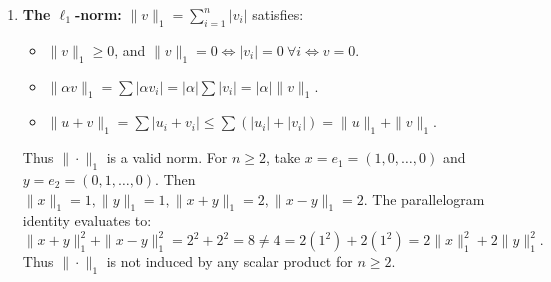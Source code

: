 \begin{exercisesolution}
\begin{enumerate}[label=\textbf{(\alph*)}]
    \item \textbf{The $\ell_1$-norm:}
    $\|v\|_1 = \sum_{i=1}^n |v_i|$ satisfies:
    \begin{itemize}
        \item $\|v\|_1 \ge 0$, and $\|v\|_1 = 0 \iff |v_i| = 0 \ \forall i \iff v = 0$.
        \item $\|\alpha v\|_1 = \sum |\alpha v_i| = |\alpha| \sum |v_i| = |\alpha| \|v\|_1$.
        \item $\|u + v\|_1 = \sum |u_i + v_i| \le \sum (|u_i| + |v_i|) = \|u\|_1 + \|v\|_1$.
    \end{itemize}
    Thus $\|\cdot\|_1$ is a valid norm.
    For $n \ge 2$, take $x = e_1 = (1, 0, \dots, 0)$ and $y = e_2 = (0, 1, \dots, 0)$.
    Then $\|x\|_1 = 1, \|y\|_1 = 1, \|x+y\|_1 = 2, \|x-y\|_1 = 2$.
    The parallelogram identity evaluates to:
    \[
    \|x+y\|_1^2 + \|x-y\|_1^2 = 2^2 + 2^2 = 8 \ne 4 = 2(1^2) + 2(1^2) = 2\|x\|_1^2 + 2\|y\|_1^2.
    \]
    Thus $\|\cdot\|_1$ is not induced by any scalar product for $n \ge 2$. \qedhere
\end{enumerate}
\end{exercisesolution}

